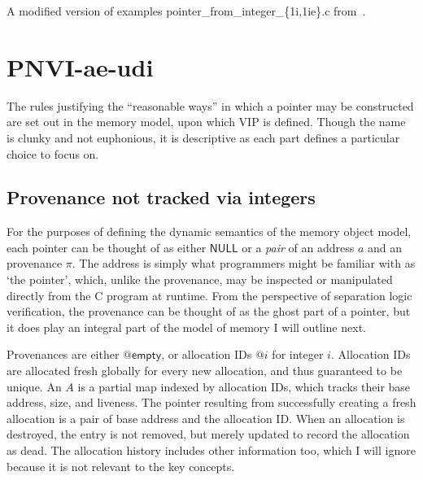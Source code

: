 \begin{marginfigure}
    \raggedright%
    \caption{A modified version of examples
        pointer\_from\_integer\_\{1i,1ie\}.c
        from~\textcite{memarian2019exploring}.}\label{fig:mem-model-ptr-from-int}
\end{marginfigure}%

\section{PNVI-ae-udi}

The rules justifying the ``reasonable ways'' in which a pointer may be
constructed are set out in the  memory model, upon which VIP is
defined. Though the name is clunky and not euphonious, it is descriptive as each
part defines a particular choice to focus on.

\subsection{Provenance not tracked via integers}

For the purposes of defining the dynamic semantics of the memory object model,
each pointer can be thought of as either $\mathsf{NULL}$ or a \emph{pair} of an
address $a$ and an provenance $\pi$. The address is simply what programmers
might be familiar with as `the pointer', which, unlike the provenance, may be
inspected or manipulated directly from the C program at runtime. From the
perspective of separation logic verification, the provenance can be thought of
as the ghost part of a pointer, but it does play an integral part of the model
of memory I will outline next.

Provenances are either $@\mathsf{empty}$, or allocation IDs $@i$ for integer
$i$. Allocation IDs are allocated fresh
globally for every new
allocation, and thus guaranteed to be unique. An 
$\mathit{A}$ is a partial map indexed by allocation IDs, which tracks their
base address, size, and liveness. The pointer
resulting from successfully creating a fresh allocation is a pair of base
address and the allocation ID\@. When an allocation is destroyed, the entry is
not removed, but merely updated to record the allocation as dead. The
allocation history includes other information too, which I will ignore because
it is not relevant to the key concepts.

